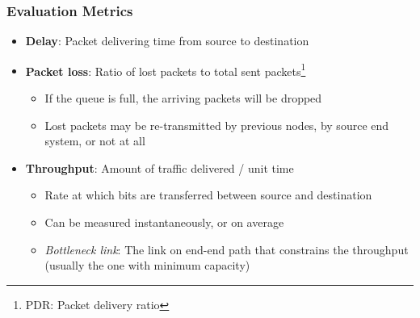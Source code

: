 \subsubsection{Evaluation Metrics}
\begin{itemize}
	\item \textbf{Delay}: Packet delivering time from source to destination
	\item \textbf{Packet loss}: Ratio of lost packets to total sent packets\footnote{PDR: Packet delivery ratio}
	\begin{itemize}
		\item If the queue is full, the arriving packets will be dropped
		\item Lost packets may be re-transmitted by previous nodes, by source end system, or not at all
	\end{itemize}
	\item \textbf{Throughput}: Amount of traffic delivered / unit time
	\begin{itemize}
		\item Rate at which bits are transferred between source and destination
		\item Can be measured instantaneously, or on average
		\item \textit{Bottleneck link}: The link on end-end path that constrains the throughput (usually the one with minimum capacity)
	\end{itemize}
\end{itemize}

